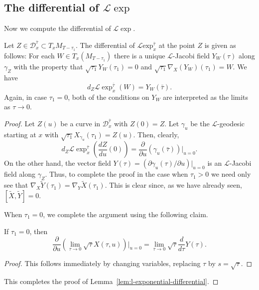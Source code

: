 \subsection{The differential of ${\mathcal L}\exp$}
Now we compute the differential of ${\mathcal L}\exp$.


\begin{lemma}\label{lem:l-exponential-differential}
\label{DLJacobi}
Let $Z\in {\mathcal D}_x^{\bar\tau}\subset T_xM_{T-\tau_1}$. The
differential of ${\mathcal L}\mathrm{exp}^{\bar\tau}_x$
at the point $Z$ is given as follows: For each $W\in
T_x(M_{T-\tau_1})$ there is a unique ${\mathcal L}$-Jacobi
field $Y_W(\tau)$ along
$\gamma_Z$ with the property that $\sqrt{\tau_1}Y_W(\tau_1)=0$ and
$\sqrt{\tau_1}\nabla_X(Y_W)(\tau_1)=W$. We have
$$d_Z{\mathcal L}\exp^{\bar\tau}_x(W)=Y_W(\bar\tau).$$
Again, in case $\tau_1=0$, both of the conditions on $Y_W$ are interpreted as
the limits as $\tau\rightarrow 0$.
\end{lemma}


\begin{proof}
Let $Z(u)$ be a curve in ${\mathcal D}_x^{\bar\tau}$ with $Z(0)=Z$.
Let $\gamma_u$ be the ${\mathcal L}$-geodesic starting at $x$ with
$\sqrt{\tau_1}X_{\gamma_u}(\tau_1)=Z(u)$. Then, clearly,
$$d_Z{\mathcal L}\exp^{\bar\tau}_x\left(\frac{dZ}{du}(0)\right)
=\frac{\partial}{\partial u}\left(\gamma_u(\bar\tau)\right)|_{u=0}.$$ On the
other hand, the vector field $Y(\tau)=\left(\partial\gamma_u(\tau)/\partial
u\right)|_{u=0} $ is an ${\mathcal L}$-Jacobi field along $\gamma_Z$.  Thus, to
complete the proof in the case when $\tau_1>0$ we need only see that
$\nabla_X\widetilde Y(\tau_1)=\nabla_Y\widetilde X(\tau_1)$. This is clear
since, as we have already seen, $[\widetilde X,\widetilde Y]=0$.

  When $\tau_1=0$, we complete the
argument using the following claim.

\begin{claim}\label{claim:l-exp-tau-derivative-limit}
If $\tau_1=0$, then
$$\frac{\partial}{\partial u}\left(\lim_{\tau\rightarrow 0}\sqrt{\tau}X(\tau,u)\right)|_{u=0}=
\lim_{\tau\rightarrow 0}\sqrt{\tau}\frac{d}{d\tau}Y(\tau).$$
\end{claim}

\begin{proof} This follows immediately by changing variables,
replacing $\tau$ by $s=\sqrt{\tau}$.
\end{proof}
This completes the proof of Lemma~\ref{lem:l-exponential-differential}.
\end{proof}

